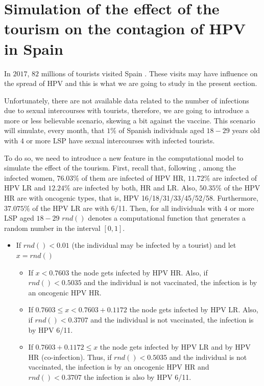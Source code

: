 \section{Simulation of the effect of the tourism on the contagion of HPV in Spain}
In $2017$, $82$ millions of tourists visited Spain \cite{INEturismo}. These visits may have influence on the spread of HPV and this is what we are going to study in the present section.

Unfortunately, there are not available data related to the number of infections due to sexual intercourses with tourists, therefore, we are going to introduce a more or less believable scenario, skewing a bit against the vaccine. This scenario will simulate, every month, that $1\%$ of Spanish individuals aged $18-29$ years old with $4$ or more LSP have sexual intercourses with infected tourists.

To do so, we need to introduce a new feature in the computational model to simulate the effect of the tourism. First, recall that, following \cite{castellsague2012prevalence}, among the infected women, $76.03\%$ of them are infected of HPV HR, $11.72\%$ are infected of HPV LR and $12.24\%$ are infected by both, HR and LR. Also, $50.35\%$ of the HPV HR are with oncogenic types, that is, HPV 16/18/31/33/45/52/58. Furthermore, $37.075\%$ of the HPV LR are with 6/11. Then, for all individuals with $4$ or more LSP aged $18-29$ $rnd()$ denotes a computational function that generates a random number in the interval $[0,1]$.

\begin{itemize}
	\item If $rnd()<0.01$ (the individual may be infected by a tourist) and let $x=rnd()$
	\begin{itemize}
		\item If $x < 0.7603$ the node gets infected by HPV HR. Also, if $rnd() < 0.5035$ and the individual is not vaccinated, the infection is by an oncogenic HPV HR.
		\item If $0.7603 \leq x < 0.7603 + 0.1172$ the node gets infected by HPV LR. Also, if $rnd() < 0.3707$ and the individual is not vaccinated, the infection is by HPV 6/11.
		\item If $0.7603 + 0.1172 \leq x $ the node gets infected by HPV LR and by HPV HR (co-infection). Thus, if $rnd() < 0.5035$ and the individual is not vaccinated, the infection is by an oncogenic HPV HR and $rnd() < 0.3707$ the infection is also by HPV 6/11.
	\end{itemize}
\end{itemize}

